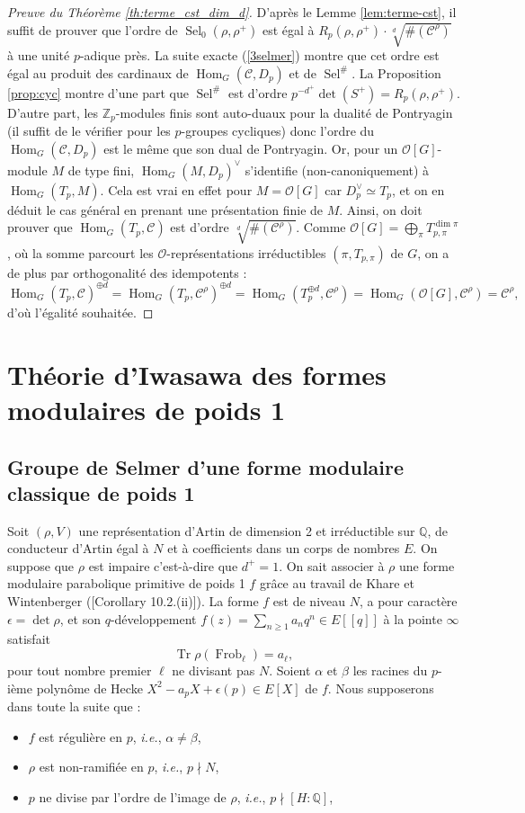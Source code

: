 \documentclass[12pt]{amsart}
\newcommand\bQ{\mathbb{Q}}
\newcommand\Zp{{\mathbb{Z}_{p}}}
\newcommand\cC{\mathcal{C}}
\newcommand\cO{\mathcal{O}}
\DeclareMathOperator{\Hom}{Hom}
\DeclareMathOperator{\Tr}{Tr}
\DeclareMathOperator{\Frob}{Frob}
\DeclareMathOperator{\Sel}{Sel}
\theoremstyle{defstyle}
\theoremstyle{thmstyle}
\begin{document}
\begin{proof}[Preuve du Théorème \ref{th:terme_cst_dim_d}]
	D'après le Lemme \ref{lem:terme-cst}, il suffit de prouver que l'ordre de $\Sel_0(\rho,\rho^+)$ est égal à $R_p(\rho,\rho^+) \cdot \sqrt[d]{\#\left(\cC^\rho\right)}$ à une unité $p$-adique près. La suite exacte (\ref{3selmer}) montre que cet ordre est égal au produit des cardinaux de $\Hom_G(\cC,D_p)$ et de $\Sel^\#$. La Proposition \ref{prop:cyc} montre d'une part que $\Sel^\#$ est d'ordre $p^{-d^+}{\det\left(S^+\right)}=R_p(\rho,\rho^+)$. D'autre part, les $\Zp$-modules finis sont auto-duaux pour la dualité de Pontryagin (il suffit de le vérifier pour les $p$-groupes cycliques) donc l'ordre du $\Hom_G(\cC,D_p)$ est le même que son dual de Pontryagin. Or, pour un $\cO[G]$-module $M$ de type fini, $\Hom_G(M,D_p)^\vee$ s'identifie (non-canoniquement) à $\Hom_G(T_p,M)$. Cela est vrai en effet pour $M=\cO[G]$ car $D_p^\vee\simeq T_p$, et on en déduit le cas général en prenant une présentation finie de $M$. Ainsi, on doit prouver que $\Hom_G(T_p,\cC)$ est d'ordre $\sqrt[d]{\#\left(\cC^\rho\right)}$. Comme $\cO[G] = \bigoplus_\pi T_{p,\pi}^{\dim\pi}$, où la somme parcourt les $\cO$-représentations irréductibles $(\pi,T_{p,\pi})$ de $G$, on a de plus par orthogonalité des idempotents : 
	$$\Hom_G(T_p,\cC)^{\oplus d} =\Hom_G(T_p,\cC^\rho)^{\oplus d} = \Hom_G(T_p^{\oplus d},\cC^\rho) = \Hom_G(\cO[G],\cC^\rho) = \cC^\rho, $$
	d'où l'égalité souhaitée.
\end{proof}

	\section{Théorie d'Iwasawa des formes modulaires de poids 1}
 \subsection{Groupe de Selmer d'une forme modulaire classique de poids 1}

Soit $(\rho,V)$ une représentation d'Artin de dimension 2 et irréductible sur $\bQ$, de conducteur d'Artin égal à $N$ et à coefficients dans un corps de nombres $E$. On suppose que $\rho$ est impaire c'est-à-dire que $d^+=1$. On sait associer à $\rho$ une forme modulaire parabolique primitive de poids 1 $f$ grâce au travail de Khare et Wintenberger (\cite{KW}[Corollary 10.2.(ii)]). La forme $f$ est de niveau $N$, a pour caractère $\epsilon=\det \rho$, et son $q$-développement $f(z)=\sum_{n\geq 1} a_nq^n \in E[[q]]$ à la pointe $\infty$ satisfait 
$$\Tr \rho(\Frob_\ell) = a_\ell,$$
pour tout nombre premier $\ell$ ne divisant pas $N$. Soient $\alpha$ et $\beta$ les racines du $p$-ième polynôme de Hecke $X^2-a_p X+\epsilon(p)\in E[X]$ de $f$. Nous supposerons dans toute la suite que : 
\begin{itemize}
	\item[\textbf{(rég)}] $f$ est régulière en $p$, \textit{i.e.}, $\alpha\neq \beta$,  
	\item[\textbf{(nr)}] $\rho$ est non-ramifiée en $p$, \textit{i.e.}, $p\nmid N$,
	\item[\textbf{(deg)}] $p$ ne divise par l'ordre de l'image de $\rho$, \textit{i.e.}, $p\nmid [H:\bQ]$,
\end{itemize}
\end{document}
